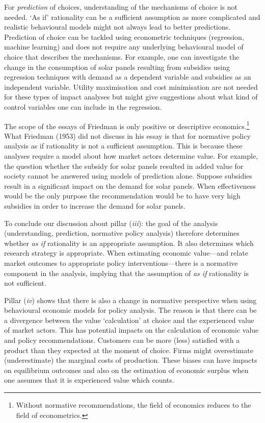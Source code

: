 \documentclass[
]{book}
\begin{document}
For \emph{prediction} of choices, understanding of the mechanisms of choice is not needed. `As if' rationality can be a sufficient assumption as more complicated and realistic behavioural models might not always lead to better predictions. Prediction of choice can be tackled using econometric techniques (regression, machine learning) and does not require any underlying behavioural model of choice that describes the mechanisms. For example, one can investigate the change in the consumption of solar panels resulting from subsidies using regression techniques with demand as a dependent variable and subsidies as an independent variable. Utility maximisation and cost minimisation are not needed for these types of impact analyses but might give suggestions about what kind of control variables one can include in the regression.

The scope of the essays of Friedman is only positive or descriptive economics.\footnote{Without normative recommendations, the field of economics reduces to the field of econometrics.} What Friedman (1953) did not discuss in his essay is that for normative policy analysis as if rationality is not a sufficient assumption. This is because these analyses require a model about how market actors determine value. For example, the question whether the subsidy for solar panels resulted in added value for society cannot be answered using models of prediction alone. Suppose subsidies result in a significant impact on the demand for solar panels. When effectiveness would be the only purpose the recommendation would be to have very high subsidies in order to increase the demand for solar panels.

To conclude our discussion about pillar (\emph{iii}): the goal of the analysis (understanding, prediction, normative policy analysis) therefore determines whether \emph{as if} rationality is an appropriate assumption. It also determines which research strategy is appropriate. When estimating economic value---and relate market outcomes to appropriate policy interventions---there is a normative component in the analysis, implying that the assumption of \emph{as if} rationality is not sufficient.

Pillar (\emph{iv}) shows that there is also a change in normative perspective when using behavioural economic models for policy analysis. The reason is that there can be a divergence between the value `calculation' at choice and the experienced value of market actors. This has potential impacts on the calculation of economic value and policy recommendations. Customers can be more (less) satisfied with a product than they expected at the moment of choice. Firms might overestimate (underestimate) the marginal costs of production. These biases can have impacts on equilibrium outcomes and also on the estimation of economic surplus when one assumes that it is experienced value which counts.
\end{document}
